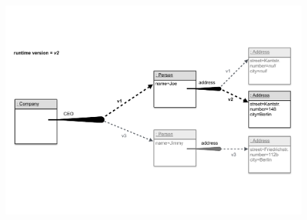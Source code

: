 \begin{figure}[h]
    \centering
    \includegraphics[width=\textwidth]{figures/4_approach/7_objectGraphWithVARefs.pdf}
    \caption{}
    \label{fig:ObjectGraphWithWithReferencesResolvedAlongVersion2}
\end{figure}











